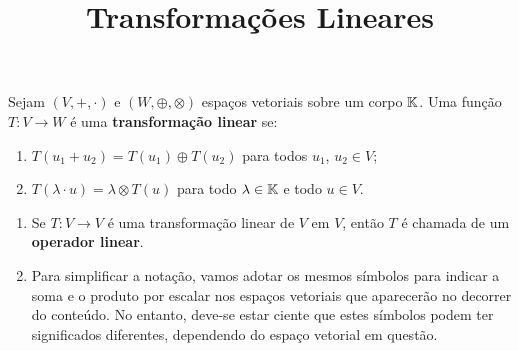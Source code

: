 \documentclass{beamer}
\title{Transformações Lineares}
\author[\autor]{\autor}
\institute[\instituto]{\instituto}
\date{}
\begin{document}
\begin{frame}
    \maketitle
\end{frame}


\begin{frame}
    \begin{definicao}
        Sejam $(V, +, \cdot)$  e $(W, \oplus, \otimes)$  espaços vetoriais sobre um corpo $\mathbb{K}$.  Uma função $T \colon V \to W$  é uma \textbf{transformação linear} se:
        \begin{enumerate}[label={\roman*})]
            \item $T(u_1 + u_2)  = T(u_1)  \oplus T(u_2)$  para todos $u_1$, $u_2 \in V$;

            \vspace*{1.5cm}

            \item $T(\lambda \cdot u)  = \lambda  \otimes T(u)$  para todo $\lambda \in \mathbb{K}$ e todo $u \in V$.
        \end{enumerate}
    \end{definicao}
\end{frame}

\begin{frame}
    \begin{observacoes}
        \begin{enumerate}[label={\roman*})]
            \item Se $T \colon V \to V$ é uma transformação linear  de $V$ em $V$, então  $T$ é chamada de um \textbf{operador linear}.

            \vspace*{1.5cm}

            \item Para simplificar a notação,  vamos adotar os mesmos símbolos para indicar a soma  e o produto por escalar  nos espaços vetoriais que aparecerão no decorrer do conteúdo.  No entanto, deve-se estar ciente que estes símbolos podem ter significados diferentes,  dependendo do espaço vetorial em questão.
        \end{enumerate}
    \end{observacoes}
\end{frame}
\end{document}
